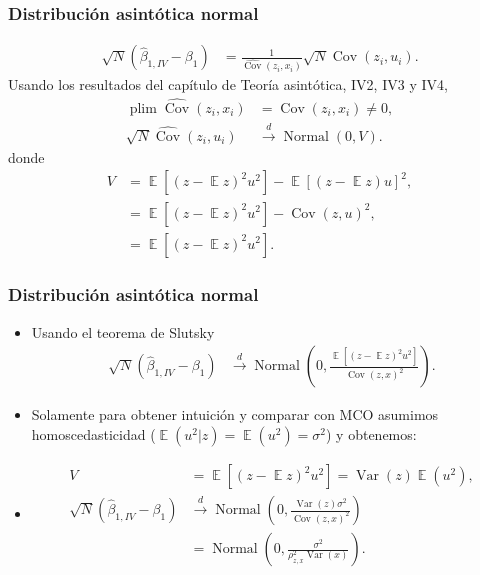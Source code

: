 \documentclass[t, compress, spanish, aspectratio=169]{beamer}
\DeclareMathOperator{\plim}{plim}
\DeclareMathOperator{\Var}{Var}
\DeclareMathOperator{\Cov}{Cov}
\DeclareMathOperator{\N}{Normal}
\DeclareMathOperator{\E}{\mathbb{E}}
\newcommand{\dto}{\stackrel{d}{\longrightarrow}}
\begin{document}
\begin{frame}
    \frametitle{Distribuci\'on asint\'otica normal}
    \vspace*{-0.6em}
        \begin{align*}
            \sqrt{N} (\hat \beta_{1,IV} - \beta_1)&= \frac{1}{\widehat{\Cov}(z_i,x_i)}\sqrt{N}\widehat{\Cov}(z_i,u_i).
        \end{align*}
        Usando los resultados del cap\'itulo de Teor\'ia asint\'otica, IV2, IV3 y IV4,
        \begin{align*}
            \plim \widehat{\Cov}(z_i,x_i) & = {\Cov}(z_i,x_i) \neq 0, \\
            \sqrt{N}\widehat{\Cov}(z_i,u_i) &\dto \N (0,V).
        \end{align*}
        donde 
        \begin{align*}
            V&=\E[(z-\E z)^2u^2]-\E[(z-\E z)u]^2,\\
            &=\E[(z-\E z)^2u^2]-\Cov(z,u)^2,\\
            &=\E[(z-\E z)^2u^2].
        \end{align*}
\end{frame}
\begin{frame}
    \frametitle{Distribuci\'on asint\'otica normal}
    \begin{itemize}
        \item [] Usando el teorema de Slutsky
        \begin{align*}
            \sqrt{N}(\hat \beta_{1,IV} - \beta_1) &\dto \N \left(0,\frac{\E[(z-\E z)^2u^2]}{\Cov(z,x)^2}\right).
        \end{align*}
        \item  \alert{Solamente} para obtener intuici\'on y comparar con MCO asumimos homoscedasticidad ($\E(u^2|z)=\E(u^2)=\sigma^2$) y obtenemos:
        \item [] 
        \begin{align*}
        	V&=\E[(z-\E z)^2u^2]=\Var(z)\E(u^2),\\
            \sqrt{N}(\hat \beta_{1,IV} - \beta_1) &\dto \N \left(0,\frac{\Var(z)\sigma^2}{\Cov(z,x)^2}\right)\\
            &= \N \left(0,\frac{\sigma^2}{\rho_{z,x}^2\Var(x)}\right).
        \end{align*}
    \end{itemize}
\end{frame}
\end{document}

